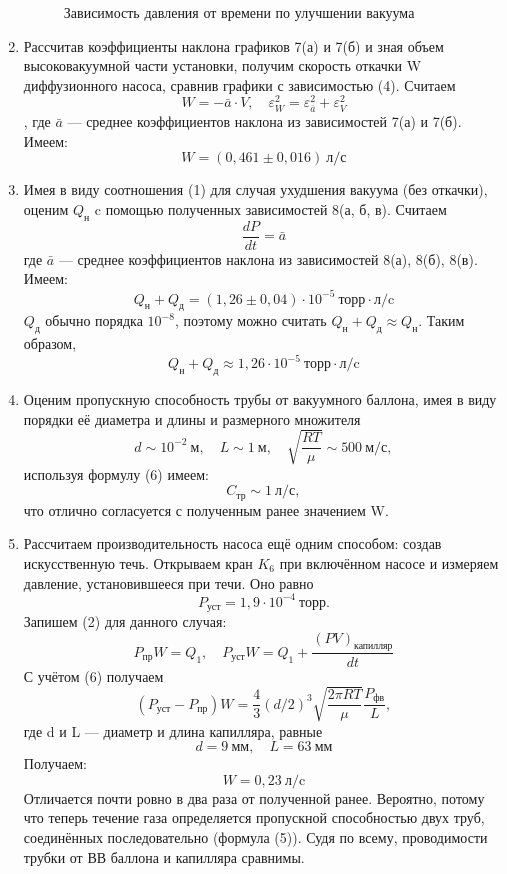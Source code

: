 \documentclass[12pt,a4paper]{article}
\begin{document}
\begin{enumerate}
	\begin{figure}[!h]
		\begin{center}
		\end{center}
		\caption{Зависимость давления от времени по улучшении вакуума}
	\end{figure}
	\item
	Рассчитав коэффициенты наклона графиков 7(а) и 7(б) и зная объем высоковакуумной части установки, получим скорость откачки W диффузионного насоса, сравнив графики с зависимостью (4). Считаем $$W = -\bar{a}\cdot V, \quad\varepsilon_W^2 = \varepsilon_{\bar{a}}^2 + \varepsilon_V^2$$,  где $\bar{a}$ --- среднее коэффициентов наклона из зависимостей 7(а) и 7(б). Имеем:
	$$W = (0,461\pm0,016) ~\text{л/с}$$
	\item
	Имея в виду соотношения (1) для случая ухудшения вакуума (без откачки), оценим $Q_\text{н}$ c помощью полученных зависимостей 8(а, б, в). Считаем $$\frac{dP}{dt} = \bar{a}$$ где $\bar{a}$ --- среднее коэффициентов наклона из зависимостей 8(а), 8(б), 8(в). Имеем:
	$$Q_\text{н} + Q_\text{д} = (1,26\pm0,04)\cdot 10^{-5} ~\text{торр}\cdot\text{л/c}$$
	$Q_\text{д}$ обычно порядка $10^{-8}$, поэтому можно считать $Q_\text{н} + Q_\text{д} \approx Q_\text{н}$. Таким образом,
	$$Q_\text{н} + Q_\text{д} \approx 1,26\cdot 10^{-5} ~\text{торр}\cdot\text{л/c}$$
	\item Оценим пропускную способность трубы от вакуумного баллона, имея в виду порядки её диаметра и длины и размерного множителя $$d \sim 10^{-2}~\text{м},\quad L \sim 1 ~\text{м},\quad \sqrt{\frac{RT}{\mu}} \sim 500 ~\text{м/с},$$ используя формулу (6) имеем:
	$$C_\text{тр} \sim 1 ~\text{л/с},$$
	что отлично согласуется с полученным ранее значением W.
	\item
	Рассчитаем производительность насоса ещё одним способом: создав искусственную течь. Открываем кран $K_6$ при включённом  насосе и измеряем давление, установившееся при течи. Оно равно $$P_\text{уст} = 1,9 \cdot 10^{-4} ~\text{торр}.$$
	Запишем (2) для данного случая:
		$$P_\text{пр}W = Q_1, \quad P_\text{уст}W = Q_1 + \frac{(PV)_\text{капилляр}}{dt}$$
	С учётом (6) получаем
	$$(P_\text{уст} - P_\text{пр})W = \frac{4}{3}(d/2)^3\sqrt{\frac{2\pi RT}{\mu}}\frac{P_\text{фв}}{L},$$
	где d и L --- диаметр и длина капилляра, равные
	$$d = 9 ~\text{мм},\quad L = 63 ~\text{мм}$$
	Получаем:
	$$W = 0,23 ~\text{л/c}$$
	Отличается почти ровно в два раза от полученной ранее. Вероятно, потому что теперь течение газа определяется пропускной способностью двух труб, соединённых последовательно (формула (5)). Судя по всему, проводимости трубки от ВВ баллона и капилляра сравнимы.
\end{enumerate}
\end{document}
